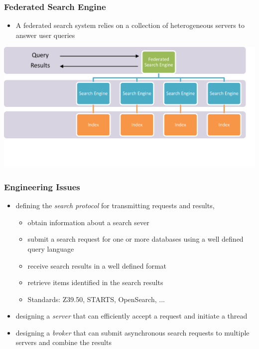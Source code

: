 \documentclass{beamer}
\begin{document}
\begin{frame}
    \frametitle{Federated Search Engine}
    
    \begin{itemize}
    \item A federated search system relies on a collection of heterogeneous
        servers to answer user queries
    \end{itemize}
    \centering
    \includegraphics[width=\textwidth]{federated}
\end{frame}

\begin{frame}
    \frametitle{Engineering Issues}
    \begin{itemize}
    \item defining the \emph{search protocol} for transmitting requests and results,
        \begin{itemize}
        \item obtain information about a search sever
        \item submit a search request for one or more databases using a well
            defined query language
        \item receive search results in a well defined format
        \item retrieve items identified in the search results
        \item Standards: Z39.50, STARTS, OpenSearch, ...
        \end{itemize}
    \item designing a \emph{server} that can efficiently accept a request and initiate
        a thread
    \item designing a \emph{broker} that can submit asynchronous search
        requests to multiple servers and combine the results
    \end{itemize}
\end{frame}
\end{document}
